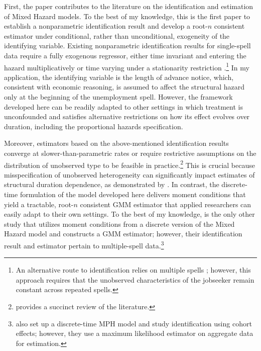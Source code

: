 \documentclass{div}
\begin{document}
First, the paper contributes to the literature on the identification and estimation of Mixed Hazard models. To the best of my knowledge, this is the first paper to establish a nonparametric identification result and develop a root-$n$ consistent estimator under conditional, rather than unconditional, exogeneity of the identifying variable. Existing nonparametric identification results for single-spell data require a fully exogenous regressor, either time invariant and entering the hazard multiplicatively \citep{ElbersRidder1982, HeckmanSinger1984a} or time varying under a stationarity restriction \citep{Brinch2007}.\footnote{An alternative route to identification relies on multiple spells \citep{Honore1993}; however, this approach requires that the unobserved characteristics of the jobseeker remain constant across repeated spells.} In my application, the identifying variable is the length of advance notice, which, consistent with economic reasoning, is assumed to affect the structural hazard only at the beginning of the unemployment spell. However, the framework developed here can be readily adapted to other settings in which treatment is unconfounded and satisfies alternative restrictions on how its effect evolves over duration, including the proportional hazards specification.

Moreover, estimators based on the above-mentioned identification results converge at slower-than-parametric rates or require restrictive assumptions on the distribution of unobserved type to be feasible in practice.\footnote{\cite{HausmanWoutersen2014} provides a succinct review of the literature.} This is crucial because misspecification of unobserved heterogeneity can significantly impact estimates of structural duration dependence, as demonstrated by \cite{HeckmanSinger1984b}. In contrast, the discrete-time formulation of the model developed here delivers moment conditions that yield a tractable, root-$n$ consistent GMM estimator that applied researchers can easily adapt to their own settings. To the best of my knowledge, \citet{AlvarezEtAl2021} is the only other study that utilizes moment conditions from a discrete version of the Mixed Hazard model and constructs a GMM estimator; however, their identification result and estimator pertain to multiple-spell data.\footnote{\cite{VanDenBerg1990} also set up a discrete-time MPH model and study identification using cohort effects; however, they use a maximum likelihood estimator on aggregate data for estimation.}
\end{document}
